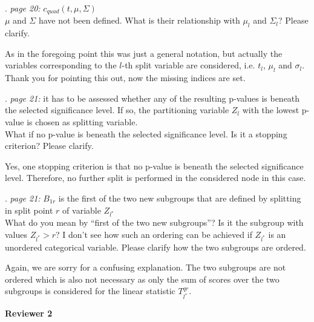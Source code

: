 \documentclass[american,foldmarks=false,noconfig]{uibklttr}
\newenvironment{review}{\fontshape{\itdefault}\fontseries{\bfdefault} \selectfont \smallskip}{\par}
\begin{document}
\begin{review}
18. {\color{quotecolor}\textit{page 20:} $c_{quad}(t, \mu, \Sigma)$}\\
$\mu$ and $\Sigma$ have not been defined. What is their relationship 
with $\mu_l$ and $\Sigma_l$? Please clarify.
\end{review}

As in the foregoing point this was just a general notation, but 
actually the variables corresponding to the $l$-th split variable 
are considered, i.e. $t_l$, $\mu_l$ and $\sigma_l$. Thank you for
pointing this out, now the missing indices are set.

\begin{review}
19. {\color{quotecolor}\textit{page 21:} it has to be assessed 
whether any of the resulting p-values is beneath the selected 
significance level. If so, the partitioning variable $Z_l$
with the lowest p-value is chosen as splitting variable.}\\
What if no p-value is beneath the selected significance level. 
Is it a stopping criterion? Please clarify.
\end{review}

Yes, one stopping criterion is that no p-value is beneath the 
selected significance level. Therefore, no further 
split is performed in the considered node in this case.

\begin{review}
20. {\color{quotecolor}\textit{page 21:} $B_{1r}$ is the first 
of the two new subgroups that are defined by splitting in split 
point $r$ of variable $Z_{l^{\ast}}$}\\
What do you mean by ``first of the two new subgroups''? Is it 
the subgroup with values $Z_{l^{\ast}} > r$? I don't see how 
such an ordering can be achieved if $Z_{l^{\ast}}$ is an 
unordered categorical variable. Please clarify how the two
subgroups are ordered.
\end{review}

Again, we are sorry for a confusing explanation. The two subgroups 
are not ordered which is also not necessary as only the sum of 
scores over the two subgroups is considered for the linear 
statistic $T_{l^{\ast}}^{qr}$.

\newpage


\textbf{\LARGE Reviewer 2}
\end{document}
